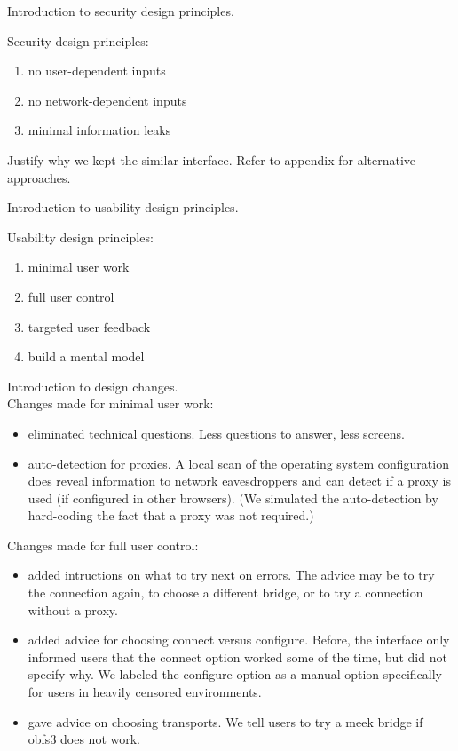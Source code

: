 \documentclass[USenglish,oneside,twocolumn]{article}
\begin{document}
{\color {blue}
Introduction to security design principles. 

Security design principles: 
\begin{enumerate}
\item no user-dependent inputs 
\item no network-dependent inputs
\item minimal information leaks
\end{enumerate} 

Justify why we kept the similar interface. Refer to appendix for alternative approaches. 

Introduction to usability design principles. 

Usability design principles: 
\begin{enumerate}
\item minimal user work
\item full user control  
\item targeted user feedback
\item build a mental model
\end{enumerate} 

Introduction to design changes.  \\

\noindent Changes made for minimal user work: 
\begin{itemize}
\item eliminated technical questions. Less questions to answer, less screens. 
\item auto-detection for proxies. A local scan of the operating system configuration does reveal information to network eavesdroppers and can detect if a proxy is used (if configured in other browsers). (We simulated the auto-detection by hard-coding the fact that a proxy was not required.)
\end{itemize} 

Changes made for full user control: 
\begin{itemize}
\item added intructions on what to try next on errors. The advice may be to try the connection again, to choose a different bridge, or to try a connection without a proxy. 
\item added advice for choosing connect versus configure. Before, the interface only informed users that the connect option worked some of the time, but did not specify why. We labeled the configure option as a manual option  specifically for users in heavily censored environments.
\item gave advice on choosing transports. We tell users to try a meek bridge if obfs3 does not work.
\end{itemize}

}
\end{document}
